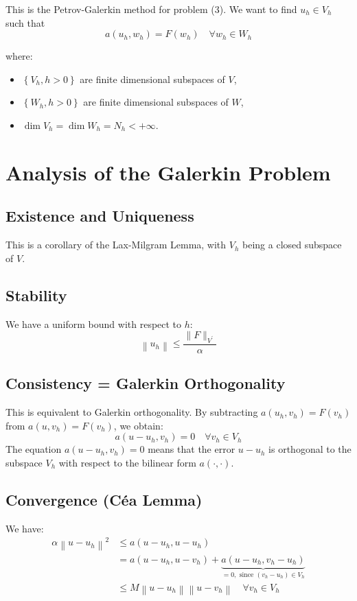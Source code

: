 \documentclass[11pt]{book}
\begin{document}
This is the Petrov-Galerkin method for problem (3). We want to find $u_{h} \in V_{h}$ such that
\begin{equation*}
a\left(u_{h}, w_{h}\right)=F\left(w_{h}\right) \quad \forall w_{h} \in W_{h}
\end{equation*}

where:
\begin{itemize}
\item $\left\{V_{h}, h>0\right\}$ are finite dimensional subspaces of $V$,
\item $\left\{W_{h}, h>0\right\}$ are finite dimensional subspaces of $W$,
\item $\operatorname{dim} V_{h}=\operatorname{dim} W_{h}=N_{h}<+\infty$.
\end{itemize}

\section*{Analysis of the Galerkin Problem}
\subsection*{Existence and Uniqueness}
This is a corollary of the Lax-Milgram Lemma, with $V_{h}$ being a closed subspace of $V$.

\subsection*{Stability}
We have a uniform bound with respect to $h$:
\begin{equation*}
\left\|u_{h}\right\| \leq \frac{\|F\|_{V^{\prime}}}{\alpha}
\end{equation*}

\subsection*{Consistency = Galerkin Orthogonality}
This is equivalent to Galerkin orthogonality. By subtracting $a\left(u_{h}, v_{h}\right)=F\left(v_{h}\right)$ from $a\left(u, v_{h}\right)=F\left(v_{h}\right)$, we obtain:
\begin{equation*}
a\left(u-u_{h}, v_{h}\right)=0 \quad \forall v_{h} \in V_{h}
\end{equation*}
The equation \( a(u - u_h, v_h) = 0 \) means that the error \( u - u_h \) is orthogonal to the subspace \( V_h \) with respect to the bilinear form \( a(\cdot, \cdot) \).

\subsection*{Convergence (Céa Lemma)}
We have:
\begin{align}
\alpha\left\|u-u_{h}\right\|^{2} & \leq a\left(u-u_{h}, u-u_{h}\right) \\
& =a\left(u-u_{h}, u-v_{h}\right)+\underbrace{a\left(u-u_{h}, v_{h}-u_{h}\right)}_{=0, \text{ since } (v_h - u_h) \in V_h} \\
& \leq M\left\|u-u_{h}\right\|\left\|u-v_{h}\right\| \quad \forall v_{h} \in V_{h}
\end{align}
\end{document}
